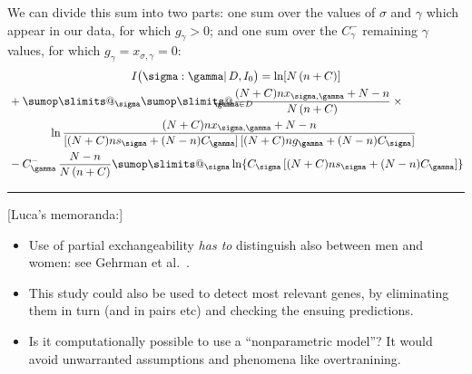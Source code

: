 \documentclass[\ifafour a4paper,12pt,\else a5paper,10pt,\fi%
onecolumn,oneside,article,%
british%
]{memoir}
\makeatletter
\theoremstyle{remark}
\theoremstyle{innote}
\def\sum{\DOTSI\sumop\slimits@}
\newcommand*{\citep}{\parencites}
\newcommand*{\citey}{\parencites*}
\DeclarePairedDelimiter\set{\{}{\}}
\renewcommand*{\|}{\mathpunct{|}}
\newcommand*{\etal}{{et al.}}
\newcommand*{\yD}{D}
\newcommand*{\mI}{I}
\newcommand*{\ys}{\sigma}
\newcommand*{\yg}{\gamma}
\newcommand*{\yso}{\ys}
\newcommand*{\ygo}{\yg}
\newcommand*{\yIc}{I_{0}}
\newcommand*{\yCs}{C_{\sigma}}
\newcommand*{\yCg}{C_{\gamma}}
\newcommand*{\yCgn}{\yCg^{-}}
\makeatother
\begin{document}
We can divide this sum into two parts: one sum over the values of $\yso$
and $\ygo$ which appear in our data, for which $g_{\ygo}>0$; and one sum
over the $\yCgn$ remaining $\ygo$ values,  for which $g_{\ygo}=x_{\yso,\ygo}=0$:
\begin{multline}
  \label{eq:mutual_info_final_three}
  \mI\bigl( \yso : \ygo \| \yD,\yIc \bigr) =
  \ln[N\,(n+C)] \\
  \begin{aligned}[b]
  &+
    \!\begin{multlined}[t][0.92\linewidth]
\sum_{\yso}
\sum_{\mathclap{\ygo \in \yD}}
  \frac{(N+C) n x_{\yso, \ygo}+N-n}{N\,(n+C)}\times{}\\
  \ln\frac{(N+C) n x_{\yso, \ygo}+N-n}{
    [(N+C) n s_{\yso}+(N-n)\yCg]\,
    [(N+C) n g_{\ygo}+(N-n)\yCs]
  } 
\end{multlined}
    \\
    &-\yCgn\,
      \frac{N-n}{N\,(n+C)}\sum_{\yso}\ln\{\yCs\,[(N+C) n s_{\yso}+(N-n)\yCg]\}
  \end{aligned}
\end{multline}

 \citep{ferguson1973,ferguson1974}

\bigskip
\hrule
[Luca's memoranda:]
\begin{itemize}
\item Use of partial exchangeability \emph{has to} distinguish also between
  men and women: see Gehrman \etal\ \citey[p.~327]{gehrmanetal2013}.
\item This study could also be used to detect most relevant genes, by
  eliminating them in turn (and in pairs etc) and checking the ensuing
  predictions.
\item Is it computationally possible to use a \enquote{nonparametric
    model}? It would avoid unwarranted assumptions and phenomena like
  overtranining.
\end{itemize}
\end{document}
